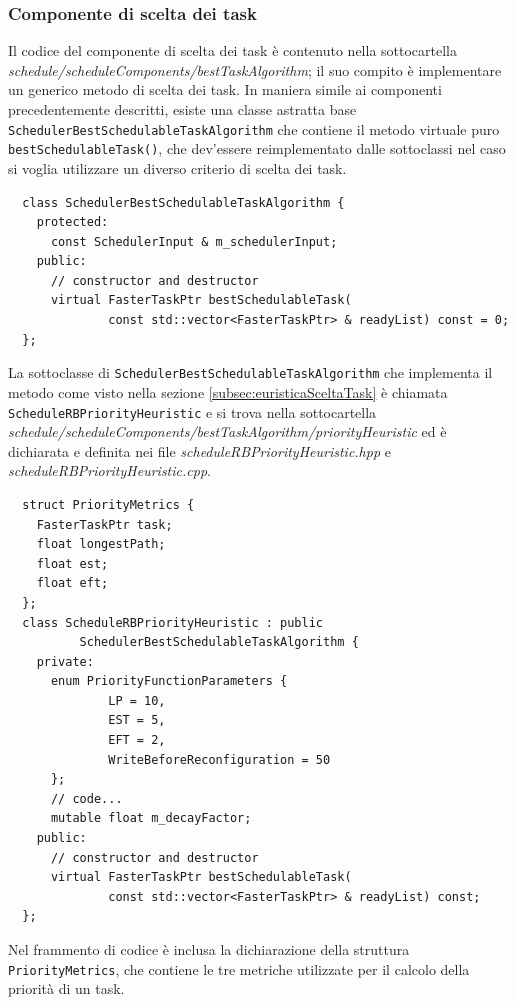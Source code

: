 \subsubsection{Componente di scelta dei task}
Il codice del componente di scelta dei task è contenuto nella sottocartella 
\emph{schedule/scheduleComponents/bestTaskAlgorithm}; il suo compito è 
implementare un generico metodo di scelta dei task. In maniera simile ai 
componenti precedentemente descritti, esiste una classe astratta base 
\verb+SchedulerBestSchedulableTaskAlgorithm+ che contiene il metodo virtuale 
puro \verb+bestSchedulableTask()+, che dev'essere reimplementato dalle 
sottoclassi nel caso si voglia utilizzare un diverso criterio di scelta dei 
task.
\newline
\begin{verbatim}
  class SchedulerBestSchedulableTaskAlgorithm {
    protected:
      const SchedulerInput & m_schedulerInput;
    public:
      // constructor and destructor
      virtual FasterTaskPtr bestSchedulableTask(
              const std::vector<FasterTaskPtr> & readyList) const = 0;
  };
\end{verbatim}

La sottoclasse di \verb+SchedulerBestSchedulableTaskAlgorithm+
che implementa il metodo come visto nella sezione \ref{subsec:euristicaSceltaTask}
è chiamata \verb+ScheduleRBPriorityHeuristic+ e si trova nella sottocartella 
\emph{schedule/scheduleComponents/bestTaskAlgorithm/priorityHeuristic} ed è 
dichiarata e definita nei file \emph{scheduleRBPriorityHeuristic.hpp} e 
\emph{scheduleRBPriorityHeuristic.cpp}.
\newline
\begin{verbatim}
  struct PriorityMetrics {
    FasterTaskPtr task;
    float longestPath;
    float est;
    float eft;
  };
  class ScheduleRBPriorityHeuristic : public 
          SchedulerBestSchedulableTaskAlgorithm {
    private:
      enum PriorityFunctionParameters {
              LP = 10,
              EST = 5,
              EFT = 2,
              WriteBeforeReconfiguration = 50
      };
      // code...
      mutable float m_decayFactor;
    public:
      // constructor and destructor
      virtual FasterTaskPtr bestSchedulableTask(
              const std::vector<FasterTaskPtr> & readyList) const;
  };
\end{verbatim}

Nel frammento di codice è inclusa la dichiarazione della 
struttura \verb+PriorityMetrics+, che contiene le tre metriche utilizzate per 
il calcolo della priorità di un task.

